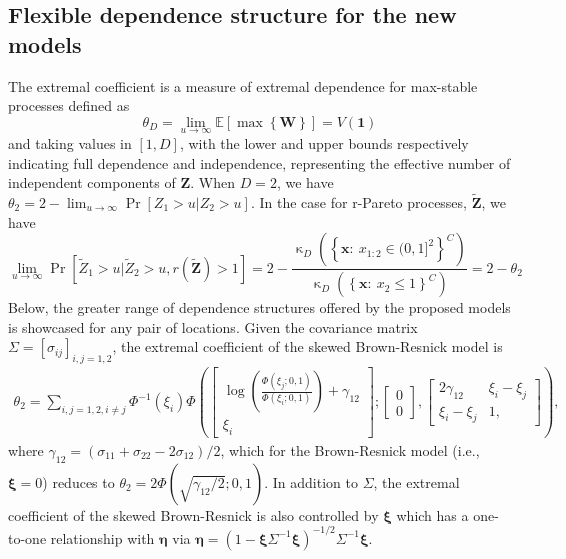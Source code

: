 \documentclass[12pt]{article}
\begin{document}
\subsection{Flexible dependence structure for the new models}
The extremal coefficient is a measure of extremal dependence \citep{Smith:1990b} for max-stable processes defined as 
%
\begin{equation*}
\theta_D =\lim_{u\to\infty} \mathbb E \left[ \max \left\{ \bm W \right\}\right]= V( \bm 1)
\end{equation*}
%
and taking values in $[1,D]$, with the lower and upper bounds respectively indicating full dependence and independence, representing the effective number of independent components of $\bm Z$. When $D=2$, we have $\theta_2=2-\lim_{u\to\infty}\Pr[Z_1>u|Z_2>u]$. In the case for r-Pareto processes, $\bm{\tilde Z}$, we have 
\begin{equation}
    \lim_{u\to\infty}\Pr[\tilde Z_1>u|\tilde Z_2>u,r(\bm {\tilde Z})>1] = 2 - \frac{\upkappa_D\left(\left\{\bm x:\ x_{1:2}\in (0,1]^2 \right\}^C\right)}{\upkappa_D\left(\left\{\bm x:\ x_2\leq 1\right\}^C\right)} = 2-\theta_2
\end{equation}
Below, the greater range of dependence structures offered by the proposed models is showcased for any pair of locations. 
Given the covariance matrix $\Sigma = \left[ \sigma_{ij}\right]_{i,j=1,2}$, the extremal coefficient of the skewed Brown-Resnick model is
%
\begin{align}
\label{eq:bi_extcoef_skewed_BR}
\theta_2 = \sum_{i,j=1,2,i\neq j}\Phi^{-1}(\xi_i)
\Phi\left(
\begin{bmatrix} 
\log\left(\frac{\Phi(\xi_j;0,1)}{\Phi(\xi_i;0,1)}\right) + \gamma_{12} \\ 
\xi_i 
\end{bmatrix};
\begin{bmatrix}
0 \\ 0
\end{bmatrix},
\begin{bmatrix}
2\gamma_{12} & \xi_i - \xi_j \\ \xi_i - \xi_j & 1,
\end{bmatrix}\right), 
\end{align}
%
where $\gamma_{12} = (\sigma_{11} + \sigma_{22} -2\sigma_{12})/2$, which for the Brown-Resnick model (i.e., $\bm \xi = 0$) reduces to $\theta_2 = 2 \Phi(\sqrt{\gamma_{12}/2}; 0, 1)$. In addition to $\Sigma$, the extremal coefficient of the skewed Brown-Resnick is also controlled by $\bm\xi$ which has a one-to-one relationship with $\bm\eta$ via $\bm\eta = (1-\bm \xi \Sigma^{-1} \bm\xi)^{-1/2}\Sigma^{-1}\bm\xi$.
\end{document}
